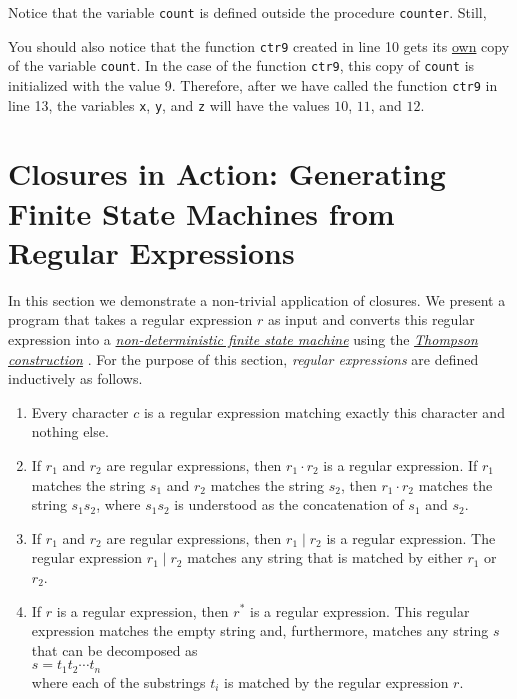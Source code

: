 Notice that the variable \texttt{count} is defined outside the procedure
\texttt{counter}.  Still, 

You should also notice that the function \texttt{ctr9} created in line 10 gets its
\underline{own} copy of the variable \texttt{count}.  In the case of the function
\texttt{ctr9}, this copy of \texttt{count} is initialized with the value 9.  Therefore, after
we have called the function \texttt{ctr9} in line 13, the variables \texttt{x}, \texttt{y}, and
\texttt{z} will have the values $10$, $11$, and $12$. 

\section[Closures in Action]{Closures in Action: Generating Finite State Machines from Regular Expressions}
In this section we demonstrate a non-trivial application of closures.  We present a program that
takes a regular expression $r$ as input and  converts this regular expression into a
\href{http://en.wikipedia.org/wiki/Nondeterministic_finite_automaton}{\emph{non-deterministic finite state machine}} 
using the 
\href{http://en.wikipedia.org/wiki/Thompson's_construction_algorithm}{\emph{Thompson construction}}
\cite{hopcroft:06}.  For the purpose of this section, \emph{regular expressions} are defined inductively as
follows.
\begin{enumerate}
\item Every character $c$ is a regular expression matching exactly this character and
      nothing else.
\item If $r_1$ and $r_2$ are regular expressions,  then $r_1 \cdot r_2$ is a regular
      expression.  If $r_1$ matches the string $s_1$ and $r_2$ matches the string $s_2$,
      then $r_1 \cdot r_2$ matches the string $s_1s_2$, where $s_1s_2$ is understood as
      the concatenation of $s_1$ and $s_2$.
\item If $r_1$ and $r_2$ are regular expressions,  then $r_1 \mid r_2$ is a regular
      expression.  The regular expression $r_1 \mid r_2$ matches any string that is matched
      by either $r_1$ or $r_2$.
\item If $r$ is a regular expression, then $r^*$ is a regular expression.
      This regular expression matches the empty string and, furthermore, matches any string
      $s$ that can be decomposed as
      \\[0.2cm]
      \hspace*{1.3cm}
      $s = t_1 t_2 \cdots t_n$
      \\[0.2cm]
      where each of the substrings $t_i$ is matched by the regular expression $r$.
\end{enumerate}
